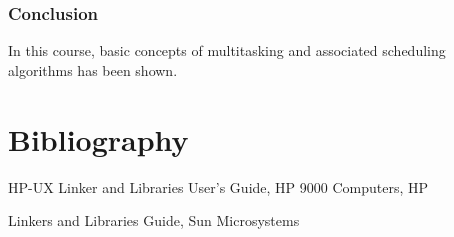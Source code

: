 
\begin{frame}
  \frametitle{Conclusion}

  In this course, basic concepts of multitasking and associated scheduling algorithms has been shown.

 

\end{frame}



%
%

\section{Bibliography}

\begin{thebibliography}{3}
HP-UX Linker and Libraries User's Guide, HP 9000 Computers, HP

Linkers and Libraries Guide, Sun Microsystems

\end{thebibliography}



